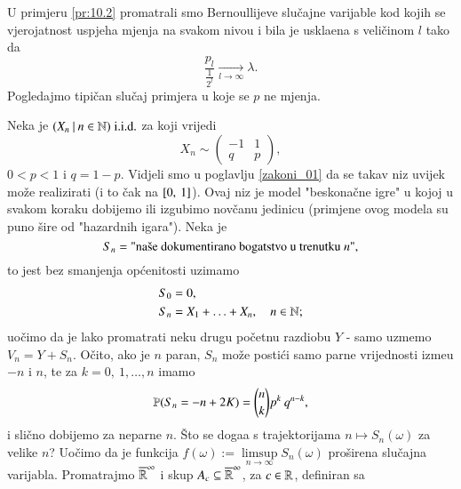 U primjeru \ref{pr:10.2} promatrali smo Bernoullijeve slu\v cajne varijable kod kojih se vjerojatnost uspjeha mjenja na svakom nivou i bila je uskla\dj ena s veli\v cinom $l$ tako da
\begin{equation*}
    \frac{p_l}{\frac{1}{2^l}} \xrightarrow[l \to \infty]{} \lambda.
\end{equation*}
Pogledajmo tipi\v can slu\v caj primjera u koje se $p$ ne mjenja.

\begin{pr}  \label{pr:10.3}
    Neka je $({X_n} \: | \: {n \in \mathbb{N}}) \; \mathrm{i.i.d.}$ za koji vrijedi
    \begin{equation*}
        X_n \sim
        \begin{pmatrix}
            -1 & 1\\
            q & p
        \end{pmatrix},
    \end{equation*}
    $0 < p < 1$ i $q = 1 - p$. Vidjeli smo u poglavlju \ref{zakoni_01} da se takav niz uvijek mo\v ze realizirati (i to \v cak na $[{0}, \:{1}]$).
    Ovaj niz je model "beskona\v cne igre" u kojoj u svakom koraku dobijemo ili izgubimo nov\v canu jedinicu (primjene ovog modela su puno \v sire od "hazardnih igara").
    Neka je
    \begin{equation*}
        S_n = \textnormal{"na\v se dokumentirano bogatstvo u trenutku $n$"},
    \end{equation*}
    to jest bez smanjenja op\' cenitosti uzimamo
    \begin{equation*}
        \begin{aligned}
            S_0 &= 0,\\
            S_n &= X_1 + \ldots + X_n, \quad n \in \mathbb{N};
        \end{aligned}
    \end{equation*}
    uo\v cimo da je lako promatrati neku drugu po\v cetnu razdiobu $Y$ - samo uzmemo $V_n = Y + S_n$.
    O\v cito, ako je $n$ paran, $S_n$ mo\v ze posti\' ci samo parne vrijednosti izme\dj u $-n$ i $n$, te za $k = 0, \: 1, \ldots, n$ imamo
    \begin{equation*}
        \mathbb{P}({S_n = -n + 2K}) = {n \choose k} p^k \: q^{n - k},
    \end{equation*}
    i sli\v cno dobijemo za neparne $n$.
    \v Sto se doga\dj a s trajektorijama $n \mapsto S_n(\omega)$ za velike $n$?
    Uo\v cimo da je funkcija $f(\omega) := \limsup\limits_{n \to \infty} S_n(\omega)$ pro\v sirena slu\v cajna varijabla.
    Promatrajmo $\overline{\mathbb{R}}^{\infty}$ i skup $A_c \subseteq \overline{\mathbb{R}}^\infty$, za $c \in \mathbb{R}$, definiran sa

\end{pr}
